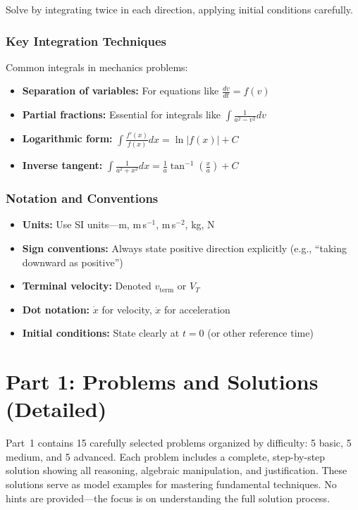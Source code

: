 \documentclass[12pt]{article}
\begin{document}
Solve by integrating twice in each direction, applying initial conditions carefully.

\subsubsection*{Key Integration Techniques}
Common integrals in mechanics problems:
\begin{itemize}[leftmargin=*]
  \item \textbf{Separation of variables:} For equations like $\frac{dv}{dt} = f(v)$
  \item \textbf{Partial fractions:} Essential for integrals like $\int \frac{1}{a^2 - v^2} dv$
  \item \textbf{Logarithmic form:} $\int \frac{f'(x)}{f(x)} dx = \ln|f(x)| + C$
  \item \textbf{Inverse tangent:} $\int \frac{1}{a^2 + x^2} dx = \frac{1}{a}\tan^{-1}\left(\frac{x}{a}\right) + C$
\end{itemize}

\subsubsection*{Notation and Conventions}
\begin{itemize}[leftmargin=*]
  \item \textbf{Units:} Use SI units---m, m\,s$^{-1}$, m\,s$^{-2}$, kg, N
  \item \textbf{Sign conventions:} Always state positive direction explicitly (e.g., ``taking downward as positive'')
  \item \textbf{Terminal velocity:} Denoted $v_{\text{term}}$ or $V_T$
  \item \textbf{Dot notation:} $\dot{x}$ for velocity, $\ddot{x}$ for acceleration
  \item \textbf{Initial conditions:} State clearly at $t = 0$ (or other reference time)
\end{itemize}

\section{Part 1: Problems and Solutions (Detailed)}
Part~1 contains 15 carefully selected problems organized by difficulty: 5 basic, 5 medium, and 5 advanced. Each problem includes a complete, step-by-step solution showing all reasoning, algebraic manipulation, and justification. These solutions serve as model examples for mastering fundamental techniques. No hints are provided---the focus is on understanding the full solution process.
\end{document}
